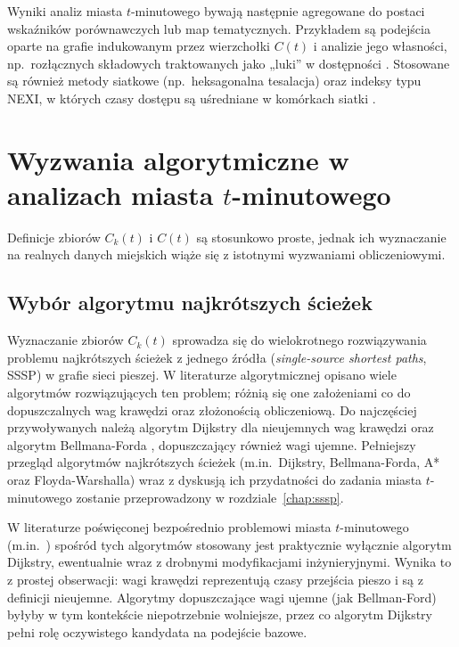 Wyniki analiz miasta $t$-minutowego bywają następnie agregowane do postaci wskaźników porównawczych
lub map tematycznych. Przykładem są podejścia oparte na grafie indukowanym przez wierzchołki $C(t)$
i analizie jego własności, np.\ rozłącznych składowych traktowanych jako „luki” w dostępności
\cite{barbieri2023graph}. Stosowane są również metody siatkowe (np.\ heksagonalna tesalacja)
oraz indeksy typu NEXI, w których czasy dostępu są uśredniane w komórkach siatki
\cite{olivari2023presenting}.

\section{Wyzwania algorytmiczne w analizach miasta $t$-minutowego}
\label{sec:intro:wyzwania}

Definicje zbiorów $C_k(t)$ i $C(t)$ są stosunkowo proste, jednak ich wyznaczanie na realnych
danych miejskich wiąże się z istotnymi wyzwaniami obliczeniowymi.

\subsection{Wybór algorytmu najkrótszych ścieżek}
\label{sec:intro:wybor-algorytmu}

Wyznaczanie zbiorów $C_k(t)$ sprowadza się do wielokrotnego rozwiązywania problemu najkrótszych ścieżek
z jednego źródła (\emph{single-source shortest paths}, SSSP) w grafie sieci pieszej.
W literaturze algorytmicznej opisano wiele algorytmów rozwiązujących ten problem; różnią się one
założeniami co do dopuszczalnych wag krawędzi oraz złożonością obliczeniową. Do najczęściej
przywoływanych należą algorytm Dijkstry \cite{dijkstra} dla nieujemnych wag krawędzi
oraz algorytm Bellmana-Forda \cite{bellman1958}, dopuszczający również wagi ujemne.
Pełniejszy przegląd algorytmów najkrótszych ścieżek (m.in.\ Dijkstry, Bellmana-Forda,
A* oraz Floyda-Warshalla) wraz z dyskusją ich przydatności do zadania miasta $t$-minutowego
zostanie przeprowadzony w rozdziale~\ref{chap:sssp}.

W literaturze poświęconej bezpośrednio problemowi miasta $t$-minutowego (m.in.\ \cite{Lam2024,barbieri2023graph,olivari2023presenting})
spośród tych algorytmów stosowany jest praktycznie wyłącznie algorytm Dijkstry, ewentualnie wraz z drobnymi
modyfikacjami inżynieryjnymi. Wynika to z prostej obserwacji: wagi krawędzi reprezentują czasy
przejścia pieszo i są z definicji nieujemne. Algorytmy dopuszczające wagi ujemne (jak Bellman-Ford)
byłyby w tym kontekście niepotrzebnie wolniejsze, przez co algorytm Dijkstry pełni rolę
oczywistego kandydata na podejście bazowe.


